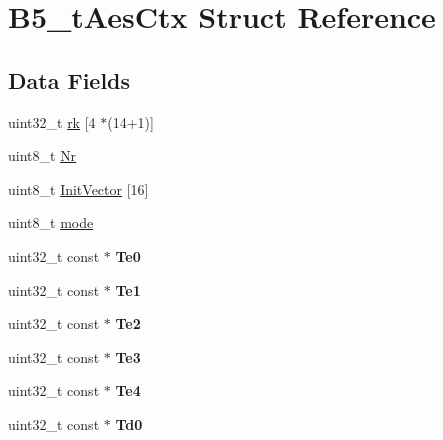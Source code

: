 \hypertarget{struct_b5__t_aes_ctx}{\section{B5\-\_\-t\-Aes\-Ctx Struct Reference}
\label{struct_b5__t_aes_ctx}
}
\subsection*{Data Fields}
\begin{DoxyCompactItemize}
\item 
uint32\-\_\-t \hyperlink{struct_b5__t_aes_ctx_a79225f883cd68df87bf30ca2907650c9}{rk} \mbox{[}4 $\ast$(14+1)\mbox{]}
\item 
uint8\-\_\-t \hyperlink{struct_b5__t_aes_ctx_a303f5a1ec9e11ea7633068db3c05dbe7}{Nr}
\item 
uint8\-\_\-t \hyperlink{struct_b5__t_aes_ctx_add6ae748bf9387dd58185afc39ee4f4f}{Init\-Vector} \mbox{[}16\mbox{]}
\item 
uint8\-\_\-t \hyperlink{struct_b5__t_aes_ctx_abee6909cfc704092d6fbfa9dea6f0e6d}{mode}
\item 
\hypertarget{struct_b5__t_aes_ctx_af4cb0ebdabba082529bedda4638e820f}{uint32\-\_\-t const $\ast$ {\bfseries Te0}}\label{struct_b5__t_aes_ctx_af4cb0ebdabba082529bedda4638e820f}

\item 
\hypertarget{struct_b5__t_aes_ctx_a94c96c2c9aee07c1eb2bb37821c18123}{uint32\-\_\-t const $\ast$ {\bfseries Te1}}\label{struct_b5__t_aes_ctx_a94c96c2c9aee07c1eb2bb37821c18123}

\item 
\hypertarget{struct_b5__t_aes_ctx_af5cd1285624916e55d6bec578eb5b840}{uint32\-\_\-t const $\ast$ {\bfseries Te2}}\label{struct_b5__t_aes_ctx_af5cd1285624916e55d6bec578eb5b840}

\item 
\hypertarget{struct_b5__t_aes_ctx_a1bc33b2c2fe914a0dda3783034323672}{uint32\-\_\-t const $\ast$ {\bfseries Te3}}\label{struct_b5__t_aes_ctx_a1bc33b2c2fe914a0dda3783034323672}

\item 
\hypertarget{struct_b5__t_aes_ctx_a9691f97b37e98d4685102b893cf2c398}{uint32\-\_\-t const $\ast$ {\bfseries Te4}}\label{struct_b5__t_aes_ctx_a9691f97b37e98d4685102b893cf2c398}

\item 
\hypertarget{struct_b5__t_aes_ctx_a4401d59349f281412cc11a797e719b41}{uint32\-\_\-t const $\ast$ {\bfseries Td0}}\label{struct_b5__t_aes_ctx_a4401d59349f281412cc11a797e719b41}


\end{DoxyCompactItemize}
